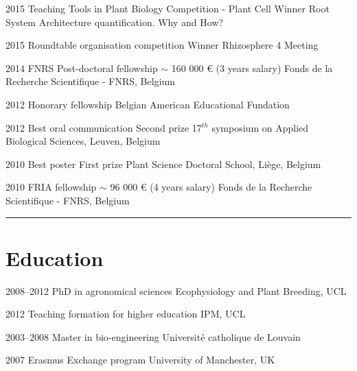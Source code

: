 \documentclass[]{friggeri-cv} %
\begin{document}
\begin{entrylist}

\entry
{2015}
{Teaching Tools in Plant Biology Competition - Plant Cell}
{Winner}
{Root System Architecture quantification. Why and How?\\}


\entry
{2015}
{Roundtable organisation competition}
{Winner}
{Rhizosphere 4 Meeting\\}

\entry
{2014}
{FNRS Post-doctoral fellowship}
{$\sim$ 160 000 € (3 years salary)}
{Fonds de la Recherche Scientifique - FNRS, Belgium\\}

\entry
{2012}
{Honorary fellowship}
{}
{Belgian American Educational Fundation\\}

\entry
{2012}
{Best oral communication}
{Second prize}
{17$^{th}$ symposium on Applied Biological Sciences, Leuven, Belgium\\}

\entry
{2010}
{Best poster}
{First prize}
{Plant Science Doctoral School, Liège, Belgium\\}

\entry
{2010}
{FRIA fellowship}
{$\sim$ 96 000 € (4 years salary)}
{Fonds de la Recherche Scientifique - FNRS, Belgium}


\end{entrylist}



\rule{\linewidth}{0.5pt}


\section{Education}

\begin{entrylist}

\entry
{2008--2012}
{PhD {\normalfont in agronomical sciences}}
{Ecophysiology and Plant Breeding, UCL}
{}

\entry
{2012}
{Teaching formation {\normalfont for higher education}}
{IPM, UCL}
{}

\entry
{2003--2008}
{Master {\normalfont in bio-engineering}}
{Université catholique de Louvain}
{}

\entry
{2007}
{Erasmus {\normalfont Exchange program }}
{University of Manchester, UK}
{}

\end{entrylist}
\end{document}
